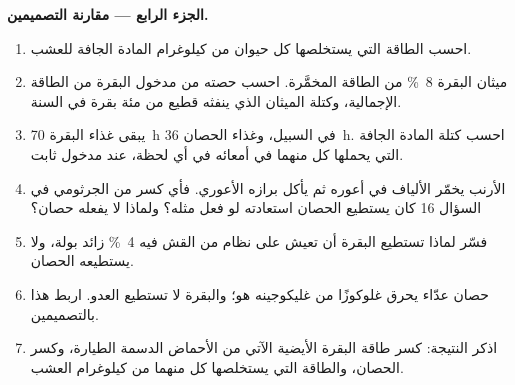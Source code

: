 \begin{problem}
\medskip
\noindent\textbf{الجزء الرابع --- مقارنة التصميمين.}
\begin{enumerate}[resume]
  \item احسب الطاقة التي يستخلصها كل حيوان من كيلوغرام المادة
        الجافة للعشب.
  \item ميثان البقرة \qty{8}{\%} من الطاقة المخمَّرة. احسب حصته من
        مدخول البقرة من الطاقة الإجمالية، وكتلة الميثان الذي ينفثه
        قطيع من مئة بقرة في السنة.
  \item يبقى غذاء البقرة \qty{70}{h} في السبيل، وغذاء الحصان
        \qty{36}{h}. احسب كتلة المادة الجافة التي يحملها كل منهما
        في أمعائه في أي لحظة، عند مدخول ثابت.
  \item الأرنب يخمّر الألياف في أعوره ثم يأكل برازه الأعوري. فأي
        كسر من  الجرثومي في السؤال 16 كان يستطيع الحصان
        استعادته لو فعل مثله؟ ولماذا لا يفعله حصان؟
  \item فسّر لماذا تستطيع البقرة أن تعيش على نظام من القش فيه
        \qty{4}{\%}  زائد بولة، ولا يستطيعه الحصان.
  \item حصان عدّاء يحرق غلوكوزًا من غليكوجينه هو؛ والبقرة لا
        تستطيع العدو. اربط هذا بالتصميمين.
  \item اذكر النتيجة: كسر طاقة البقرة الأيضية الآتي من الأحماض
        الدسمة الطيارة، وكسر الحصان، والطاقة التي يستخلصها كل
        منهما من كيلوغرام العشب.
\end{enumerate}
\end{problem}
